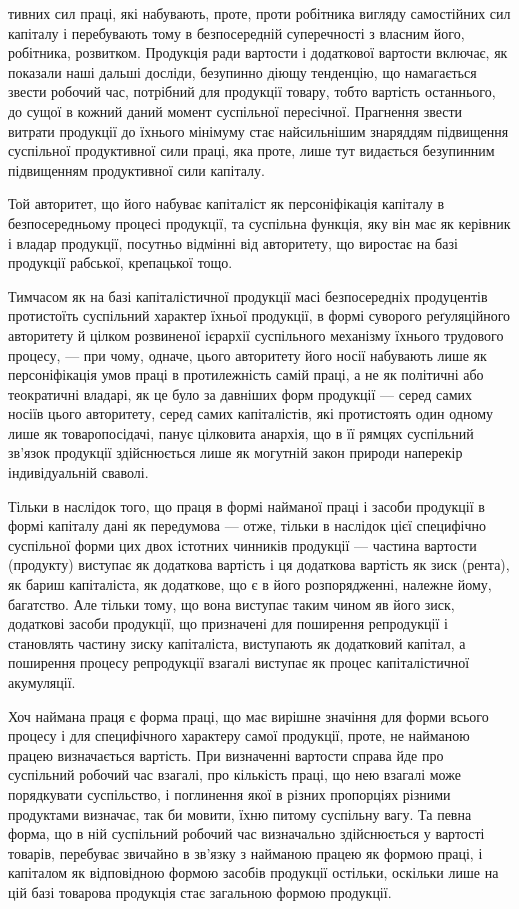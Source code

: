 \parcont{}  %
тивних сил праці, які набувають, проте, проти робітника вигляду самостійних
сил капіталу і перебувають тому в безпосередній суперечності з власним його,
робітника, розвитком. Продукція ради вартости і додаткової вартости включає,
як показали наші дальші досліди, безупинно діющу тенденцію, що намагається
звести робочий час, потрібний для продукції товару, тобто вартість останнього,
до сущої в кожний даний момент суспільної пересічної. Прагнення звести витрати
продукції до їхнього мінімуму стає найсильнішим знаряддям підвищення
суспільної продуктивної сили праці, яка проте, лише тут видається безупинним
підвищенням продуктивної сили капіталу.

Той авторитет, що його набуває капіталіст як персоніфікація капіталу в
безпосередньому процесі продукції, та суспільна функція, яку він має як керівник
і владар продукції, посутньо відмінні від авторитету, що виростає на базі
продукції рабської, крепацької тощо.

Тимчасом як на базі капіталістичної продукції масі безпосередніх продуцентів
протистоїть суспільний характер їхньої продукції, в формі суворого реґуляційного
авторитету й цілком розвиненої ієрархії суспільного механізму їхнього
трудового процесу, — при чому, одначе, цього авторитету його носії набувають
лише як персоніфікація умов праці в протилежність самій праці, а не як політичні
або теократичні владарі, як це було за давніших форм продукції — серед
самих носіїв цього авторитету, серед самих капіталістів, які протистоять один
одному лише як товаропосідачі, панує цілковита анархія, що в її рямцях суспільний
зв’язок продукції здійснюється лише як могутній закон природи наперекір
індивідуальній сваволі.

Тільки в наслідок того, що праця в формі найманої праці і засоби продукції
в формі капіталу дані як передумова — отже, тільки в наслідок цієї специфічно
суспільної форми цих двох істотних чинників продукції — частина вартости
(продукту) виступає як додаткова вартість і ця додаткова вартість як
зиск (рента), як бариш капіталіста, як додаткове, що є в його розпорядженні,
належне йому, багатство. Але тільки тому, що вона виступає таким чином яв
його зиск, додаткові засоби продукції, що призначені для поширення репродукції
і становлять частину зиску капіталіста, виступають як додатковий капітал,
а поширення процесу репродукції взагалі виступає як процес капіталістичної
акумуляції.

Хоч наймана праця є форма праці, що має вирішне значіння для
форми всього процесу і для специфічного характеру самої продукції, проте,
не найманою працею визначається вартість. При визначенні вартости справа
йде про суспільний робочий час взагалі, про кількість праці, що нею взагалі
може порядкувати суспільство, і поглинення якої в різних пропорціях різними
продуктами визначає, так би мовити, їхню питому суспільну вагу. Та певна форма,
що в ній суспільний робочий час визначально здійснюється у вартості товарів,
перебуває звичайно в зв’язку з найманою працею як формою праці, і капіталом
як відповідною формою засобів продукції остільки, оскільки лише на цій базі
товарова продукція стає загальною формою продукції.

